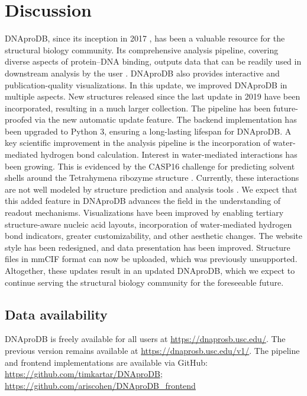\section{Discussion}
DNAproDB, since its inception in 2017 \citep{Sagendorf2017}, has been a valuable resource for the structural biology community. Its comprehensive analysis pipeline, covering diverse aspects of protein–DNA binding, outputs data that can be readily used in downstream analysis by the user \citep{Sagendorf2020}. DNAproDB also provides interactive and publication-quality visualizations. In this update, we improved DNAproDB in multiple aspects. New structures released since the last update in 2019 \citep{Sagendorf2020} have been incorporated, resulting in a much larger collection. The pipeline has been future-proofed via the new automatic update feature. The backend implementation has been upgraded to Python 3, ensuring a long-lasting lifespan for DNAproDB. 
A key scientific improvement in the analysis pipeline is the incorporation of water-mediated hydrogen bond calculation. Interest in water-mediated interactions has been growing. This is evidenced by the CASP16 challenge for predicting solvent shells around the Tetrahymena ribozyme structure \citep{kryshtafovych2023critical}. Currently, these interactions are not well modeled by structure prediction and analysis tools \citep{Abramson2024, baek2024na, Krishna2024, Mitra2024, Jumper2021, Sagendorf2024}. We expect that this added feature in DNAproDB advances the field in the understanding of readout mechanisms. 
Visualizations have been improved by enabling tertiary structure-aware nucleic acid layouts, incorporation of water-mediated hydrogen bond indicators, greater customizability, and other aesthetic changes. The website style has been redesigned, and data presentation has been improved. Structure files in mmCIF format can now be uploaded, which was previously unsupported. Altogether, these updates result in an updated DNAproDB, which we expect to continue serving the structural biology community for the foreseeable future.

\subsection{Data availability}
DNAproDB is freely available for all users at \url{https://dnaprosb.usc.edu/}. The previous version remains available at \url{https://dnaprosb.usc.edu/v1/}. 
The pipeline and frontend implementations are available via GitHub:
\url{https://github.com/timkartar/DNAproDB}; 
\url{https://github.com/ariscohen/DNAproDB_frontend}
